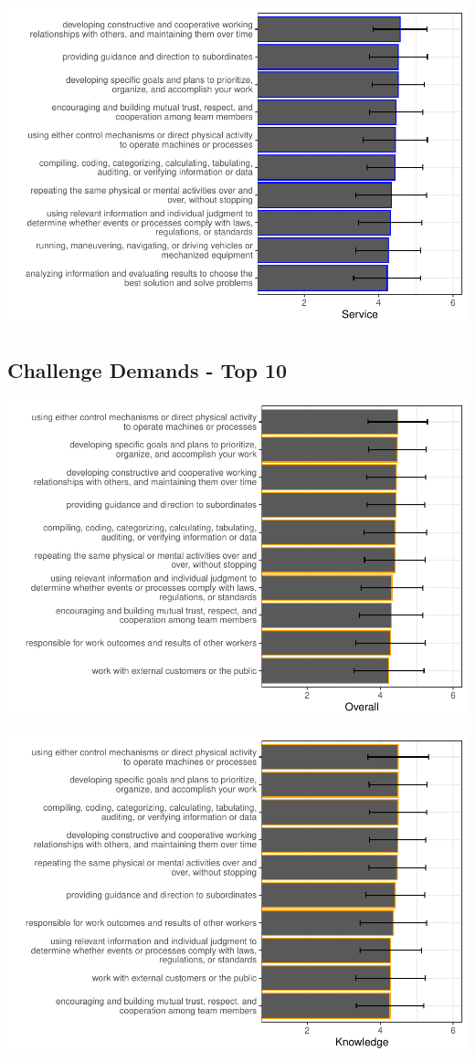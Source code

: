\documentclass[
  english,
  man]{apa6}
\begin{document}
\includegraphics{SIOPjdr2_files/figure-latex/unnamed-chunk-3-1.pdf}

\hypertarget{challenge-demands---top-10}{%
\subsection{Challenge Demands - Top 10}\label{challenge-demands---top-10}}

\includegraphics{SIOPjdr2_files/figure-latex/unnamed-chunk-4-1.pdf}

\includegraphics{SIOPjdr2_files/figure-latex/unnamed-chunk-5-1.pdf}
\end{document}
